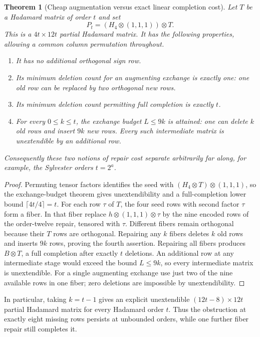 \documentclass[11pt]{article}
\newtheorem{theorem}{Theorem}[section]
\begin{document}
\begin{theorem}[Cheap augmentation versus exact linear completion cost]
Let $T$ be a Hadamard matrix of order $t$ and set
\[
 P_t=(H_4\otimes(1,1,1))\otimes T.
\]
This is a $4t\times12t$ partial Hadamard matrix. It has the following
properties, allowing a common column permutation throughout.
\begin{enumerate}
\item It has no additional orthogonal sign row.
\item Its minimum deletion count for an augmenting exchange is exactly
one: one old row can be replaced by two orthogonal new rows.
\item Its minimum deletion count permitting full completion is exactly
$t$.
\item For every $0\le k\le t$, the exchange budget $L\le9k$ is
attained: one can delete $k$ old rows and insert $9k$ new rows.
Every such intermediate matrix is unextendible by an additional row.
\end{enumerate}
Consequently these two notions of repair cost separate arbitrarily
far along, for example, the Sylvester orders $t=2^a$.
\end{theorem}
\begin{proof}
Permuting tensor factors identifies the seed with
$(H_4\otimes T)\otimes(1,1,1)$, so the exchange-budget theorem gives
unextendibility and a full-completion lower bound
$\lceil4t/4\rceil=t$.
For each row $\tau$ of $T$, the four seed rows with second factor
$\tau$ form a fiber. In that fiber replace $h\otimes(1,1,1)\otimes\tau$
by the nine encoded rows of the order-twelve repair, tensored with
$\tau$. Different fibers remain orthogonal because their $T$ rows
are orthogonal. Repairing any $k$ fibers deletes $k$ old rows and
inserts $9k$ rows, proving the fourth assertion. Repairing all fibers
produces $B\otimes T$, a full completion after exactly $t$ deletions.
An additional row at any intermediate stage would exceed the bound
$L\le9k$, so every intermediate matrix is unextendible.
For a single augmenting exchange use just two of the nine available
rows in one fiber; zero deletions are impossible by unextendibility.
\end{proof}

In particular, taking $k=t-1$ gives an explicit unextendible
$(12t-8)\times12t$ partial Hadamard matrix for every Hadamard order
$t$. Thus the obstruction at exactly eight missing rows persists at
unbounded orders, while one further fiber repair still completes it.
\end{document}
